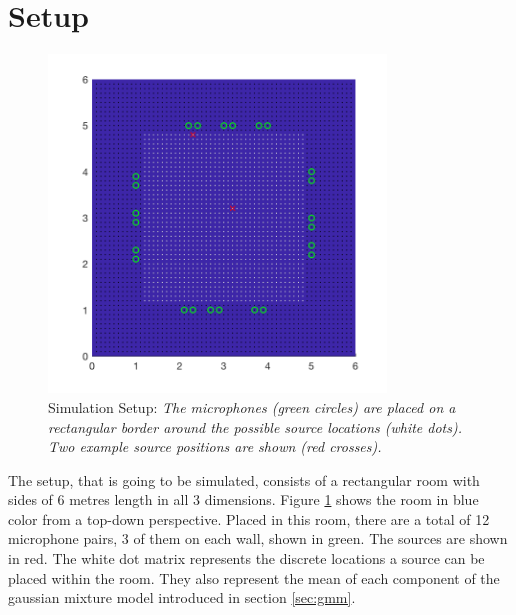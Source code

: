 \section{Setup}
\label{sec:setup}




\begin{figure}[H]
	\centering
	\includegraphics[width=0.8\textwidth]{data/plots/setup/setup.png}
	\caption[Simulation Setup]{Simulation Setup: \itshape The microphones (green circles) are placed on a rectangular border around the possible source locations (white dots). Two example source positions are shown (red crosses).}
	\label{fig:setup}
\end{figure}


The setup, that is going to be simulated, consists of a rectangular room with sides of 6 metres length in all 3 dimensions. Figure \ref{fig:setup} shows the room in blue color from a top-down perspective. Placed in this room, there are a total of 12 microphone pairs, 3 of them on each wall, shown in green. The sources are shown in red. The white dot matrix represents the discrete locations a source can be placed within the room. They also represent the mean of each component of the gaussian mixture model introduced in section \ref{sec:gmm}.

